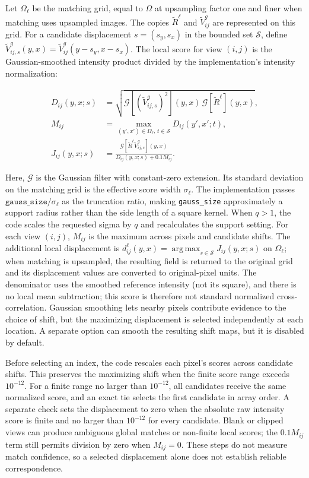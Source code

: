 Let $\Omega_\ell$ be the matching grid, equal to $\Omega$ at upsampling factor one and finer when matching uses upsampled images. The copies $\widetilde R^\ell$ and $\widetilde V^g_{ij}$ are represented on this grid. For a candidate displacement $s=(s_y,s_x)$ in the bounded set $\mathcal S$, define $\widetilde V^g_{ij,s}(y,x)=\widetilde V^g_{ij}(y-s_y,x-s_x)$. The local score for view $(i,j)$ is the Gaussian-smoothed intensity product divided by the implementation's intensity normalization:

\begin{align}
    D_{ij}(y,x;s)&=\sqrt{\mathcal G[(\widetilde V^g_{ij,s})^2](y,x)\,\mathcal G[\widetilde R^\ell](y,x)},\\
    M_{ij}&=\max_{(y',x')\in\Omega_\ell,\,t\in\mathcal S}D_{ij}(y',x';t),\\
    J_{ij}(y,x;s)&=\frac{\mathcal G[\widetilde R^\ell\widetilde V^g_{ij,s}](y,x)}{D_{ij}(y,x;s)+0.1M_{ij}}.
\end{align}

Here, $\mathcal G$ is the Gaussian filter with constant-zero extension. Its standard deviation on the matching grid is the effective score width $\sigma_\ell$.
The implementation passes $\texttt{gauss\_size}/\sigma_\ell$ as the truncation ratio, making \texttt{gauss\_size} approximately a support radius rather than the side length of a square kernel.
When $q>1$, the code scales the requested sigma by $q$ and recalculates the support setting.
For each view $(i,j)$, $M_{ij}$ is the maximum across pixels and candidate shifts. The additional local displacement is $d^\ell_{ij}(y,x)=\operatorname*{arg\,max}_{s\in\mathcal S}J_{ij}(y,x;s)$ on $\Omega_\ell$; when matching is upsampled, the resulting field is returned to the original grid and its displacement values are converted to original-pixel units.
The denominator uses the smoothed reference intensity (not its square), and there
is no local mean subtraction; this score is therefore not standard normalized
cross-correlation.
Gaussian smoothing lets nearby pixels contribute evidence
to the choice of shift, but the maximizing displacement is selected
independently at each location. A separate option can smooth the resulting
shift maps, but it is disabled by default.

Before selecting an index, the code rescales each pixel's scores across candidate shifts. This preserves the maximizing shift when the finite score range exceeds $10^{-12}$. For a finite range no larger than $10^{-12}$, all candidates receive the same normalized score, and an exact tie selects the first candidate in array order. A separate check sets the displacement to zero when the absolute raw intensity score is finite and no larger than $10^{-12}$ for every candidate. Blank or clipped views can produce ambiguous global matches or non-finite local scores; the $0.1M_{ij}$ term still permits division by zero when $M_{ij}=0$. These steps do not measure match confidence, so a selected displacement alone does not establish reliable correspondence.

